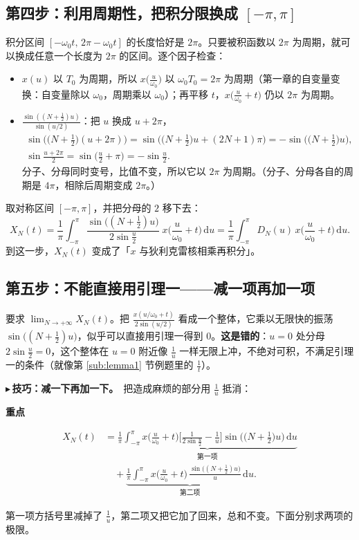 \documentclass[UTF8,a4paper,11pt]{ctexart}
\newenvironment{remember}{\begin{rememberbox}\textbf{重点}\par\smallskip}{\end{rememberbox}}
\newcounter{ex}[section]
\newcommand{\point}[1]{\par\addvspace{1ex}\noindent\textcolor{ptteal}{$\blacktriangleright$\,\textbf{#1}}\ }
\begin{document}
\subsection{第四步：利用周期性，把积分限换成 \texorpdfstring{$[-\pi,\pi]$}{[-π,π]}}
积分区间 $[-\omega_0t,\,2\pi-\omega_0t]$ 的长度恰好是 $2\pi$。只要被积函数以 $2\pi$ 为周期，就可以换成任意一个长度为 $2\pi$ 的区间。逐个因子检查：
\begin{itemize}[nosep]
\item $x(u)$ 以 $T_0$ 为周期，所以 $x\big(\frac{u}{\omega_0}\big)$ 以 $\omega_0T_0=2\pi$ 为周期（第一章的自变量变换：自变量除以 $\omega_0$，周期乘以 $\omega_0$）；再平移 $t$，$x\big(\frac{u}{\omega_0}+t\big)$ 仍以 $2\pi$ 为周期。
\item $\frac{\sin((N+\frac12)u)}{\sin(u/2)}$：把 $u$ 换成 $u+2\pi$，
\begin{gather*}
\sin\!\Big(\big(N+\tfrac12\big)(u+2\pi)\Big)=\sin\!\Big(\big(N+\tfrac12\big)u+(2N+1)\pi\Big)=-\sin\!\Big(\big(N+\tfrac12\big)u\Big),\\
\sin\frac{u+2\pi}{2}=\sin\Big(\frac u2+\pi\Big)=-\sin\frac u2 .
\end{gather*}
分子、分母同时变号，比值不变，所以它以 $2\pi$ 为周期。（分子、分母各自的周期是 $4\pi$，相除后周期变成 $2\pi$。）
\end{itemize}
取对称区间 $[-\pi,\pi]$，并把分母的 $2$ 移下去：
\[
X_N(t)=\frac{1}{\pi}\int_{-\pi}^{\pi}\frac{\sin\!\big((N+\frac12)u\big)}{2\sin\frac u2}\;x\Big(\frac{u}{\omega_0}+t\Big)\,\mathrm{d}u
=\frac{1}{\pi}\int_{-\pi}^{\pi}D_N(u)\,x\Big(\frac{u}{\omega_0}+t\Big)\,\mathrm{d}u .
\]
到这一步，$X_N(t)$ 变成了「$x$ 与狄利克雷核相乘再积分」。

\subsection{第五步：不能直接用引理一——减一项再加一项}
要求 $\lim_{N\to+\infty}X_N(t)$。把 $\frac{x(u/\omega_0+t)}{2\sin(u/2)}$ 看成一个整体，它乘以无限快的振荡 $\sin\big((N+\frac12)u\big)$，似乎可以直接用引理一得到 $0$。\textbf{这是错的}：$u=0$ 处分母 $2\sin\frac u2=0$，这个整体在 $u=0$ 附近像 $\frac{1}{u}$ 一样无限上冲，不绝对可积，不满足引理一的条件（就像第 \ref{sub:lemma1} 节例题里的 $\frac1t$）。

\point{技巧：减一下再加一下。}把造成麻烦的部分用 $\frac1u$ 抵消：
\begin{remember}
\begin{align*}
X_N(t)&=\underbrace{\frac{1}{\pi}\int_{-\pi}^{\pi}x\Big(\frac{u}{\omega_0}+t\Big)\Big[\frac{1}{2\sin\frac u2}-\frac1u\Big]\sin\!\Big(\big(N+\tfrac12\big)u\Big)\,\mathrm{d}u}_{\text{第一项}}\\
&\quad+\underbrace{\frac{1}{\pi}\int_{-\pi}^{\pi}x\Big(\frac{u}{\omega_0}+t\Big)\,\frac{\sin\big((N+\frac12)u\big)}{u}\,\mathrm{d}u}_{\text{第二项}} .
\end{align*}
\end{remember}
第一项方括号里减掉了 $\frac1u$，第二项又把它加了回来，总和不变。下面分别求两项的极限。
\end{document}
